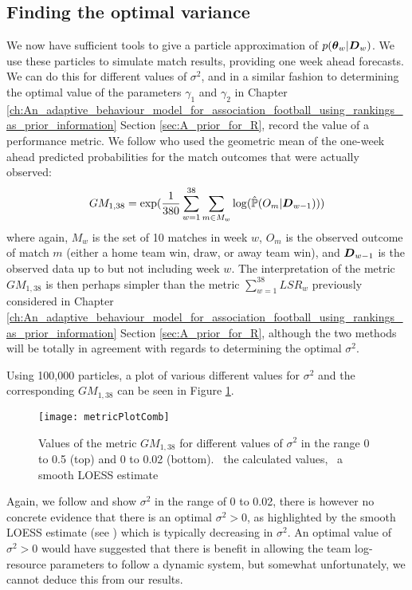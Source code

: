 \subsection{Finding the optimal variance}
\label{sec:Finding_the_optimal_variance}

We now have sufficient tools to give a particle approximation of \(p(\boldsymbol{\theta}_w | \boldsymbol{D}_w)\). We use these particles
to simulate match results, providing one week ahead forecasts. We can do this for different values of \(\sigma^2\), and
in a similar fashion to determining the optimal value of the parameters \(\gamma_1\) and \(\gamma_2\) in Chapter
\ref{ch:An_adaptive_behaviour_model_for_association_football_using_rankings_as_prior_information} Section
\ref{sec:A_prior_for_R}, record the value of a performance metric. We follow \cite{Owen2011} who used the geometric mean
of the one-week ahead predicted probabilities for the match outcomes that were actually observed:
\begin{align}
GM_{1, 38} = \exp(\frac{1}{380} \sum_{w = 1}^{38} \sum_{m \in M_w} \log(\hat{\mathbb{P}}(O_m | \boldsymbol{D}_{w-1})))
\end{align}
where again, \(M_w\) is the set of 10 matches in week \(w\), \(O_m\) is the observed outcome of match \(m\) (either a
home team win, draw, or away team win), and \(\boldsymbol{D}_{w-1}\) is the observed data up to but not including week \(w\). The
interpretation of the metric \(GM_{1, 38}\) is then perhaps simpler than the metric \(\sum_{w=1}^{38} LSR_w\) previously
considered in Chapter \ref{ch:An_adaptive_behaviour_model_for_association_football_using_rankings_as_prior_information}
Section \ref{sec:A_prior_for_R}, although the two methods will be totally in agreement with regards to determining the
optimal \(\sigma^2\).

Using 100,000 particles, a plot of various different values for \(\sigma^2\) and the corresponding \(GM_{1, 38}\) can be
seen in Figure \ref{fig:metricPlotComb}.
\begin{figure}[htp]
\begin{center}
\texttt{[image: metricPlotComb]}
\caption{Values of the metric \(GM_{1, 38}\) for different values of \(\sigma^2\) in the range 0 to 0.5 (top) and 0 to
0.02 (bottom). \protect\blackSolidLine\ the calculated values, \protect\redDashedLine\ a smooth LOESS estimate}
\label{fig:metricPlotComb}
\end{center}
\end{figure}
Again, we follow \cite{Owen2011} and show \(\sigma^2\) in the range of 0 to 0.02, there is however no concrete evidence
that there is an optimal \(\sigma^2 > 0\), as highlighted by the smooth \gls{LOESS} estimate (see \cite{cleveland1979})
which is typically decreasing in \(\sigma^2\). An optimal value of \(\sigma^2 > 0\) would have suggested that there is
benefit in allowing the team log-resource parameters to follow a dynamic system, but somewhat unfortunately, we cannot
deduce this from our results.

